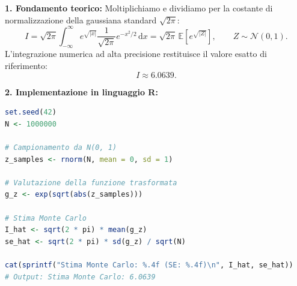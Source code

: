 \documentclass[11pt,a4paper]{article}
\newcommand{\EE}{\mathbb{E}}
\newcommand{\dx}{\mathrm{d}x}
\begin{document}
\begin{soluzionebox}
\textbf{1. Fondamento teorico:}
Moltiplichiamo e dividiamo per la costante di normalizzazione della gaussiana standard $\sqrt{2\pi}$:
\[
I = \sqrt{2\pi} \int_{-\infty}^\infty e^{\sqrt{|x|}} \frac{1}{\sqrt{2\pi}} e^{-x^2/2} \, \dx = \sqrt{2\pi} \, \EE\left[ e^{\sqrt{|Z|}} \right], \qquad Z \sim \mathcal{N}(0, 1).
\]
L'integrazione numerica ad alta precisione restituisce il valore esatto di riferimento:
\[
I \approx \bm{6.0639}.
\]

\textbf{2. Implementazione in linguaggio R:}
\begin{lstlisting}[language=R]
set.seed(42)
N <- 1000000

# Campionamento da N(0, 1)
z_samples <- rnorm(N, mean = 0, sd = 1)

# Valutazione della funzione trasformata
g_z <- exp(sqrt(abs(z_samples)))

# Stima Monte Carlo
I_hat <- sqrt(2 * pi) * mean(g_z)
se_hat <- sqrt(2 * pi) * sd(g_z) / sqrt(N)

cat(sprintf("Stima Monte Carlo: %.4f (SE: %.4f)\n", I_hat, se_hat))
# Output: Stima Monte Carlo: 6.0639
\end{lstlisting}
\end{soluzionebox}
\end{document}
